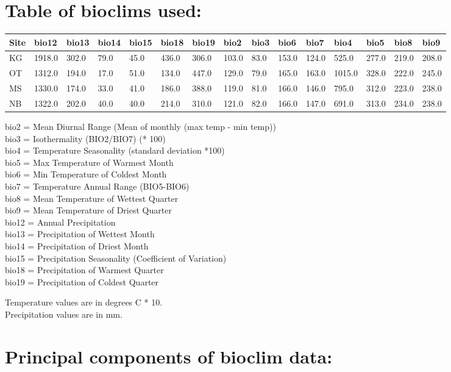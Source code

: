 \documentclass[letterpaper]{scrartcl}
\date{}
\begin{document}
{
\hypersetup{linkcolor=black}
\setcounter{tocdepth}{3}
\tableofcontents
}
\section{Table of bioclims used:}\label{table-of-bioclims-used}

\begin{longtable}[c]{@{}lllllllllllllll@{}}
\toprule
Site & bio12 & bio13 & bio14 & bio15 & bio18 & bio19 & bio2 & bio3 &
bio6 & bio7 & bio4 & bio5 & bio8 & bio9\tabularnewline
\midrule
\endhead
KG & 1918.0 & 302.0 & 79.0 & 45.0 & 436.0 & 306.0 & 103.0 & 83.0 & 153.0
& 124.0 & 525.0 & 277.0 & 219.0 & 208.0\tabularnewline
OT & 1312.0 & 194.0 & 17.0 & 51.0 & 134.0 & 447.0 & 129.0 & 79.0 & 165.0
& 163.0 & 1015.0 & 328.0 & 222.0 & 245.0\tabularnewline
MS & 1330.0 & 174.0 & 33.0 & 41.0 & 186.0 & 388.0 & 119.0 & 81.0 & 166.0
& 146.0 & 795.0 & 312.0 & 223.0 & 238.0\tabularnewline
NB & 1322.0 & 202.0 & 40.0 & 40.0 & 214.0 & 310.0 & 121.0 & 82.0 & 166.0
& 147.0 & 691.0 & 313.0 & 234.0 & 238.0\tabularnewline
\bottomrule
\end{longtable}

bio2 = Mean Diurnal Range (Mean of monthly (max temp - min temp))\\bio3
= Isothermality (BIO2/BIO7) (* 100)\\bio4 = Temperature Seasonality
(standard deviation *100)\\bio5 = Max Temperature of Warmest Month\\bio6
= Min Temperature of Coldest Month\\bio7 = Temperature Annual Range
(BIO5-BIO6)\\bio8 = Mean Temperature of Wettest Quarter\\bio9 = Mean
Temperature of Driest Quarter\\bio12 = Annual Precipitation\\bio13 =
Precipitation of Wettest Month\\bio14 = Precipitation of Driest
Month\\bio15 = Precipitation Seasonality (Coefficient of
Variation)\\bio18 = Precipitation of Warmest Quarter\\bio19 =
Precipitation of Coldest Quarter

Temperature values are in degrees C * 10.\\Precipitation values are in
mm.

\newpage

\section{Principal components of bioclim
data:}\label{principal-components-of-bioclim-data}
\end{document}
